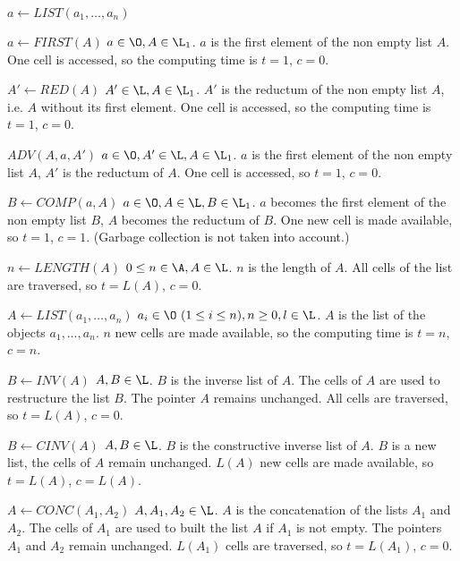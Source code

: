\begin{deflist}{$a \gets LIST(a_1, \ldots, a_n)$}
\item[$a \gets FIRST(A)$] $a \in \O, A \in \L_1$. 
     $a$ is the first element of the non empty list $A$.
     One cell is accessed, so the computing time is $t = 1$, $c = 0$.     
\item[$A' \gets RED(A)$] $A' \in \L, A \in \L_1$. 
     $A'$ is the reductum of the non empty list $A$, 
     i.e. $A$ without its first element.
     One cell is accessed, so the computing time is $t = 1$, $c = 0$.     
\item[$ADV(A, a, A')$] $a \in \O, A' \in \L, A \in \L_1$. 
     $a$ is the first element of the non empty list $A$,
     $A'$ is the reductum of $A$. 
     One cell is accessed, so $t = 1$, $c = 0$.
\item[$B \gets COMP(a,A)$] $a \in \O, A \in \L, B \in \L_1$. 
     $a$ becomes the first element of the non empty list $B$,
     $A$ becomes the reductum of $B$.
     One new cell is made available, so  
     $t = 1$, $c = 1$. (Garbage collection is not taken into account.)
\item[$n \gets LENGTH(A)$] $0 \leq n \in \A, A \in \L$. 
     $n$ is the length of $A$.
     All cells of the list are traversed, so $t = L(A)$, $c = 0$.
\item[$A \gets LIST(a_1, \ldots, a_n)$] 
     $a_i \in \O \  (1 \leq i \leq n), n \geq 0, l \in \L$. 
     $A$ is the list of the objects $a_1, \ldots, a_n$.
     $n$ new cells are made available, so the computing time is 
     $t = n$, $c = n$. 
\item[$B \gets INV(A)$] $A, B \in \L$. 
     $B$ is the inverse list of $A$. The cells of 
     $A$ are used to restructure the list $B$. The pointer $A$
     remains unchanged.
     All cells are traversed, so $t = L(A)$, $c = 0$.
\item[$B \gets CINV(A)$] $A, B \in \L$. 
     $B$ is the constructive inverse list of $A$. 
     $B$ is a new list, the cells of $A$ remain unchanged.
     $L(A)$ new cells are made available, so 
     $t = L(A)$, $c = L(A)$. 
\item[$A \gets CONC(A_1, A_2)$] $A, A_1, A_2 \in \L$. 
     $A$ is the concatenation of the lists $A_1$ and $A_2$. 
     The cells of $A_1$ are used to built the list $A$
     if $A_1$ is not empty. The pointers $A_1$ and $A_2$ 
     remain unchanged.
     $L(A_1)$ cells are traversed, so $t = L(A_1)$, $c = 0$.

\end{deflist}
